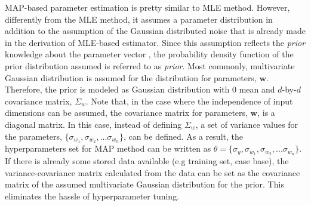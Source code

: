MAP-based parameter estimation is pretty similar to MLE method. However, differently from the MLE method, it assumes a parameter distribution in addition to the assumption of the Gaussian distributed noise that is already made in the derivation of MLE-based estimator. Since this assumption reflects the \textit{prior} knowledge about the parameter vector , the probability density function of the prior distribution assumed is referred to as \textit{prior}. Most commonly, multivariate Gaussian distribution is assumed for the distribution for parameters, $\pmb{w}$. Therefore, the prior is modeled as Gaussian distribution with $0$ mean and $d$-by-$d$ covariance matrix, $\Sigma_w$. Note that, in the case where the independence of input dimensions can be assumed, the covariance matrix for parameters, $\pmb{w}$, is a diagonal matrix. In this case, instead of defining  $\Sigma_w$, a set of variance values for the parameters, $\{\sigma_{w_1}, \sigma_{w_2}, ... \sigma_{w_n}\}$, can be defined. As a result, the hyperparameters set for MAP method can be written as $\theta=\{\sigma_y, \sigma_{w_1}, \sigma_{w_2}, ... \sigma_{w_n}\}$. If there is already some stored data available (e.g training set, case base), the variance-covariance matrix calculated from the data can be set as the covariance matrix of the assumed multivariate Gaussian distribution for the prior. This eliminates the hassle of hyperparameter tuning.

